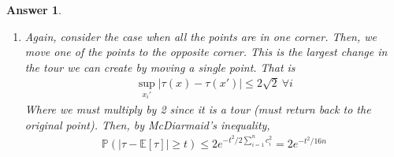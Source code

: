 \documentclass[12pt]{article}
\theoremstyle{colon}
\newtheorem*{answer}{Answer}
\begin{document}
\begin{answer}
\begin{enumerate}[label=\arabic*)]
    \item Again, consider the case when all the points are in one corner. Then, we move one of the points to the opposite corner. This is the largest change in the tour we can create by moving a single point. That is
      \begin{gather*}
        \sup_{x_i'} \lvert \tau(x) - \tau(x') \rvert \leq 2 \sqrt{2} \ \forall i
      \end{gather*}
      Where we must multiply by 2 since it is a tour (must return back to the original point). Then, by McDiarmaid's inequality,
      \begin{gather*}
        \mathbb{P}( \lvert \tau - \mathbb{E}[\tau] \rvert \geq t) \leq 2 e^{-t^2 / 2 \sum_{i=1}^n c_i^2} = 2 e^{-t^2 / 16n}
      \end{gather*}
  \end{enumerate}
\end{answer}
\end{document}

